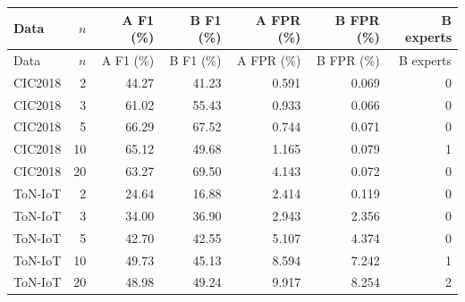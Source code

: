 \begingroup\small
\begin{longtable}{lrrrrrr}
\toprule
Data & $n$ & A F1 (\%) & B F1 (\%) & A FPR (\%) & B FPR (\%) & B experts \\
\midrule\endfirsthead
\toprule
Data & $n$ & A F1 (\%) & B F1 (\%) & A FPR (\%) & B FPR (\%) & B experts \\
\midrule\endhead
CIC2018 & 2 & 44.27 & 41.23 & 0.591 & 0.069 & 0 \\
CIC2018 & 3 & 61.02 & 55.43 & 0.933 & 0.066 & 0 \\
CIC2018 & 5 & 66.29 & 67.52 & 0.744 & 0.071 & 0 \\
CIC2018 & 10 & 65.12 & 49.68 & 1.165 & 0.079 & 1 \\
CIC2018 & 20 & 63.27 & 69.50 & 4.143 & 0.072 & 0 \\
\midrule
ToN-IoT & 2 & 24.64 & 16.88 & 2.414 & 0.119 & 0 \\
ToN-IoT & 3 & 34.00 & 36.90 & 2.943 & 2.356 & 0 \\
ToN-IoT & 5 & 42.70 & 42.55 & 5.107 & 4.374 & 0 \\
ToN-IoT & 10 & 49.73 & 45.13 & 8.594 & 7.242 & 1 \\
ToN-IoT & 20 & 48.98 & 49.24 & 9.917 & 8.254 & 2 \\
\midrule
\end{longtable}
\endgroup
